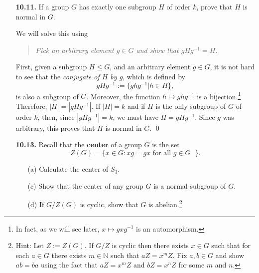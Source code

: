\documentclass[12pt,reqno]{amsart}
\newcommand{\N}{\ensuremath{\mathbb{N}}}
\newcommand{\<}{\ensuremath{\langle}}
\renewcommand{\>}{\ensuremath{\rangle}}
\begin{document}
\begin{enumerate}
\item[{\bf 10.11.}]
If a group $G$ has exactly one subgroup $H$ of order $k$, prove that
$H$ is normal in $G$. 

\medskip
{} 
We will solve this using\\[4pt]
\medskip
\begin{quote}
\emph{Pick an arbitrary element $g\in G$ and show that $gHg^{-1} = H$.}
\end{quote}
\medskip
First, given a subgroup $H\leq G$, and an arbitrary element $g\in G$, it is not hard to
see that the \emph{conjugate of $H$ by $g$}, which is defined by
\[
gHg^{-1} := \{ghg^{-1} | h\in H\},
\]
is also a subgroup of $G$.  Moreover, the function $h \mapsto ghg^{-1}$ is a
bijection.\footnote{In fact, as we will see later, $x\mapsto gxg^{-1}$ 
is an automorphism.}  
Therefore, $|H| = |gHg^{-1}|$.  If $|H| =k$ and if $H$ is the only
subgroup of $G$ of order $k$, then, since $|gHg^{-1}| = k$, we must have 
$H = gHg^{-1}$.
Since $g$ was arbitrary, this proves that $H$ is normal in $G$.
\qed

\bigskip

\item[{\bf 10.13.}]
Recall that the {\bf center} of a group $G$ is the set 
\[
Z(G) = \{ x \in G : xg = gx \text{ for all $g \in G$ } \}.
\]
\begin{enumerate}
 
 \item[(a)]
Calculate the center of $S_3$.
 
 
 \item[(c)]
Show that the center of any group $G$ is a normal subgroup of $G$. 
 
 \item[(d)]
If $G / Z(G)$ is cyclic, show that $G$ is abelian.\footnote{Hint: Let $Z := Z(G)$.  If
  $G/Z$ is cyclic then there exists $x\in G$ such that for each $a\in G$ 
  there exists $m\in \N$ such that $aZ = x^mZ$.
  Fix $a, b\in G$ and show $ab = ba$ using the fact that $aZ = x^mZ$ and
  $bZ = x^nZ$ for some $m$ and $n$.}
 
\end{enumerate}

\newpage


\end{enumerate}
\end{document}
